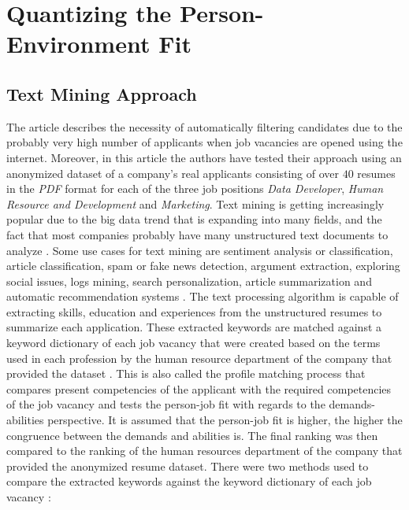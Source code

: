 \documentclass[draft,final]{thesisclass} %
\begin{document}
\section{Quantizing the Person-Environment Fit}

\subsection{Text Mining Approach} \label{text_mining_approach}
The article \textcite{text_mining_for_automatic_profiling} describes the necessity of automatically filtering candidates due to the probably very high number of applicants when job vacancies are opened using the internet.
Moreover, in this article the authors have tested their approach using an anonymized dataset of a company's real applicants consisting of over $40$ resumes in the \textit{PDF} format for each of the three job positions \textit{Data Developer}, \textit{Human Resource and Development} and \textit{Marketing}.
Text mining is getting increasingly popular due to the big data trend that is expanding into many fields, and the fact that most companies probably have many unstructured text documents to analyze \parencite[49]{text_mining_for_automatic_profiling}.
Some use cases for text mining are sentiment analysis or classification, article classification, spam or fake news detection, argument extraction, exploring social issues, logs mining, search personalization, article summarization and automatic recommendation systems \parencite[49]{text_mining_for_automatic_profiling}.
The text processing algorithm is capable of extracting skills, education and experiences from the unstructured resumes to summarize each application.
These extracted keywords are matched against a keyword dictionary of each job vacancy that were created based on the terms used in each profession by the human resource department of the company that provided the dataset \parencite[47]{text_mining_for_automatic_profiling}.
This is also called the profile matching process that compares present competencies of the applicant with the required competencies of the job vacancy and tests the person-job fit with regards to the demands-abilities perspective.
It is assumed that the person-job fit is higher, the higher the congruence between the demands and abilities is.
The final ranking was then compared to the ranking of the human resources department of the company that provided the anonymized resume dataset.
There were two methods used to compare the extracted keywords against the keyword dictionary of each job vacancy \parencite[53-58]{text_mining_for_automatic_profiling}:
\end{document}
